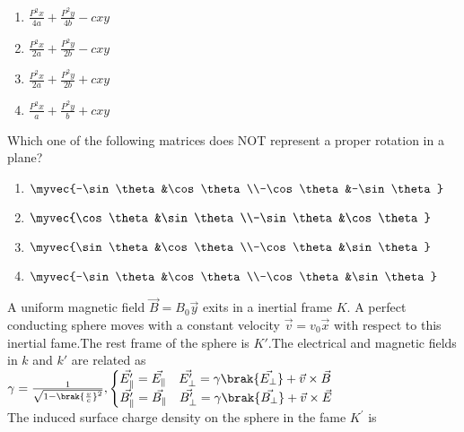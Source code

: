     \begin{enumerate}
        \item $\frac{P^2x}{4a}+\frac{P^2y}{4b}-cxy$
        \item $\frac{P^2x}{2a}+\frac{P^2y}{2b}-cxy$
        \item $\frac{P^2x}{2a}+\frac{P^2y}{2b}+cxy$
        \item $\frac{P^2x}{a}+\frac{P^2y}{b}+cxy$
    \end{enumerate}
    \item Which one of the following matrices does NOT represent a proper rotation in a plane?
    \begin{enumerate}
        \item $\myvec{-\sin\theta&\cos\theta\\-\cos\theta&-\sin\theta}$
        \item $\myvec{\cos\theta&\sin\theta\\-\sin\theta&\cos\theta}$
        \item $\myvec{\sin\theta&\cos\theta\\-\cos\theta&\sin\theta}$
        \item $\myvec{-\sin\theta&\cos\theta\\-\cos\theta&\sin\theta}$  
    \end{enumerate}
    \item A uniform magnetic field $\vec{B}=B_0\vec{y}$ exits in a inertial frame $K$. A perfect conducting sphere moves with a constant velocity $\vec{v}=v_0\vec{x}$ with respect to this inertial
    fame.The rest frame of the sphere is $K\prime$.The electrical and magnetic fields in $k$ and $k\prime$ are related as\\
    $
    \gamma=\frac{1}{\sqrt{1-\brak{\frac{v}{c}}^2}},\begin{cases}
        \vec{E^{\prime}_{\parallel}}=\vec{E_{\parallel}}\quad \vec{E^{\prime}_{\perp}}=\gamma\brak{\vec{E_{\perp}}}+\vec{v}\times\vec{B}\\
    \vec{B^{\prime}_{\parallel}}=\vec{B_{\parallel}}\quad \vec{B^{\prime}_{\perp}}=\gamma\brak{\vec{B_{\perp}}}+\vec{v}\times\vec{E}
    \end{cases}$\\
    The induced surface charge density on the sphere in the fame $K^{\prime}$ is

